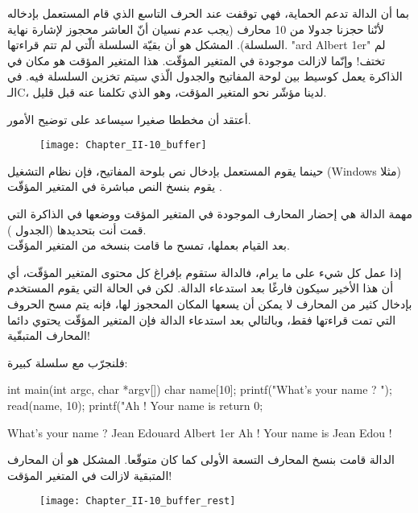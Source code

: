 بما أن الدالة
تدعم الحماية، فهي توقفت عند الحرف التاسع الذي قام المستعمل بإدخاله لأنّنا حجزنا جدولا من 10 محارف (يجب عدم نسيان أنّ العاشر محجوز لإشارة نهاية السلسلة).
المشكل هو أن بقيّة السلسلة الّتي لم تتم قراءتها.
"\textenglish{ard Albert 1er}"
لم تختف! وإنّما لازالت موجودة في المتغير المؤقّت. هذا المتغير المؤقت هو مكان في الذاكرة يعمل كوسيط بين لوحة المفاتيح والجدول الّذي سيتم تخزين السلسلة فيه. في الـ\textenglish{C}،
لدينا مؤشّر نحو المتغير المؤقت، وهو
الذي تكلمنا عنه قبل قليل.

أعتقد أن مخططا صغيرا سيساعد على توضيح الأمور.

\begin{figure}[H]
	\centering
	\texttt{[image: Chapter\_II-10\_buffer]}
\end{figure}

حينما يقوم المستعمل بإدخال نص بلوحة المفاتيح، فإن نظام التشغيل 
(\textenglish{Windows}
مثلا) يقوم بنسخ النص مباشرة في المتغير المؤقّت
.

مهمة الدالة
هي إحضار المحارف الموجودة في المتغير المؤقت ووضعها في الذاكرة التي قمت أنت بتحديدها (الجدول
).\\
بعد القيام بعملها، تمسح ما قامت بنسخه من المتغير المؤقّت.

إذا عمل كل شيء على ما يرام، فالدالة
ستقوم بإفراغ كل محتوى المتغير المؤقّت، أي أن هذا الأخير سيكون فارغًا بعد استدعاء الدالة. لكن في الحالة التي يقوم المستخدم بإدخال كثير من المحارف لا يمكن أن يسعها المكان المحجوز لها، فإنه يتم مسح الحروف التي تمت قراءتها فقط، وبالتالي بعد استدعاء الدالة
فإن المتغير المؤقّت يحتوي دائما المحارف المتبقّية!

فلنجرّب مع سلسلة كبيرة:

\begin{Csource}
  int main(int argc, char *argv[])
  {
  	char name[10];
  	printf("What's your name ? ");
  	read(name, 10);
  	printf("Ah ! Your name is %
  	return 0;
  }
\end{Csource}

\begin{Console}
  What's your name ? Jean Edouard Albert 1er
  Ah ! Your name is Jean Edou !
\end{Console}

الدالة
قامت بنسخ المحارف التسعة الأولى كما كان متوقّعا. المشكل هو أن المحارف المتبقية لازالت في المتغير المؤقت!

\begin{figure}[H]
	\centering
	\texttt{[image: Chapter\_II-10\_buffer\_rest]}
\end{figure}


